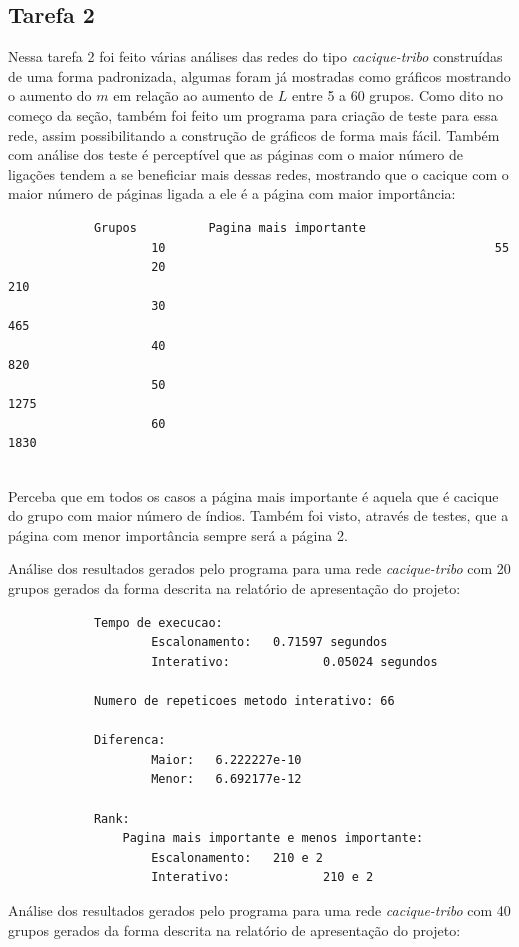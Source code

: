 \documentclass[12pt]{article}
\begin{document}
	\subsection{Tarefa 2}
		Nessa tarefa 2 foi feito várias análises das redes do tipo \emph{cacique-tribo} construídas de uma forma padronizada, algumas foram já mostradas como gráficos mostrando o aumento do $m$ em relação ao aumento de $L$ entre 5 a 60 grupos. Como dito no começo da seção, também foi feito um programa para criação de teste para essa rede, assim possibilitando a construção de gráficos de forma mais fácil. Também com análise dos teste é perceptível que as páginas com o maior número de ligações tendem a se beneficiar mais dessas redes, mostrando que o cacique com o maior número de páginas ligada a ele é a página com maior importância:\\
		
		\lstset{xrightmargin=150pt,}
		
		\begin{lstlisting}
			Grupos			Pagina mais importante
					10												55
					20												210
					30												465
					40												820
					50												1275
					60												1830
			
		\end{lstlisting}
		Perceba que em todos os casos a página mais importante é aquela que é cacique do grupo com maior número de índios. Também foi visto, através de testes, que a página com menor importância sempre será a página 2.
		
		Análise dos resultados gerados pelo programa para uma rede \emph{cacique-tribo} com 20 grupos gerados da forma descrita na relatório de apresentação do projeto:\\
			
		\lstset{xrightmargin=70pt,}
		\begin{lstlisting}
			Tempo de execucao:
		 			Escalonamento: 	 0.71597 segundos
		 			Interativo: 	 	 	0.05024 segundos 

			Numero de repeticoes metodo interativo: 66 

			Diferenca: 
		 			Maior: 	 6.222227e-10
		 			Menor: 	 6.692177e-12

			Rank: 
		 		Pagina mais importante e menos importante:
		 	 		Escalonamento: 	 210 e 2
		 	 		Interativo: 	 	 	210 e 2
		\end{lstlisting}
		
		Análise dos resultados gerados pelo programa para uma rede \emph{cacique-tribo} com 40 grupos gerados da forma descrita na relatório de apresentação do projeto:\\
		
\end{document}
